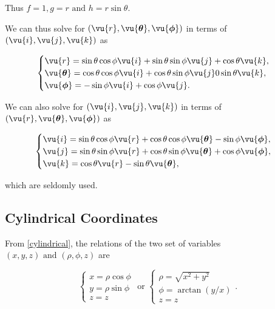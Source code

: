 \documentclass[english,a4paper,12pt]{report}
\begin{document}
Thus \(f = 1, g = r \text { and }  h = r\sin \theta \).

We can thus solve for \((\vu{r} , \vu{\boldsymbol{\theta } }, \vu{\boldsymbol{\phi } })\) in terms of \((\vu{i}, \vu{j} ,\vu{k} )\) as 

\begin{equation}
    \begin{cases}
        \vu{r} = \sin \theta \cos \phi  \vu{i}  + \sin \theta \sin \phi  \vu{j}  + \cos \theta  \vu{k},  \\
        \vu{\boldsymbol{\theta } } = \cos \theta \cos \phi \vu{i}  + \cos \theta \sin \phi \vu{j} 0 \sin \theta \vu{k}, \\
        \vu{\boldsymbol{\phi } } = -\sin \phi  \vu{i} + \cos \phi \vu{j}. 
    \end{cases}
\end{equation}



We can also solve for \((\vu{i} , \vu{j}, \vu{k} )\) in terms of \((\vu{r} , \vu{\boldsymbol{\theta } }, \vu{\boldsymbol{\phi } } )\) as  

\begin{equation}
    \begin{cases}
        \vu{i} = \sin \theta \cos \phi \vu{r} + \cos \theta \cos \phi \vu{\boldsymbol{\theta } } - \sin \phi \vu{\boldsymbol{\phi } }, \\
        \vu{j} = \sin \theta \sin \phi \vu{r} + \cos \theta \sin \phi \vu{\boldsymbol{\theta } } + \cos \phi \vu{\boldsymbol{\phi } }, \\
        \vu{k} = \cos \theta \vu{r} - \sin \theta \vu{\boldsymbol{\theta } },
    \end{cases}
\end{equation}

which are seldomly used.



	
\subsection{Cylindrical Coordinates}

From \cref{cylindrical}, the relations of the two set of variables \((x,y,z) \text { and } (\rho , \phi , z)\)  are

\begin{equation}
    \begin{cases} x = \rho \cos \phi \\ y = \rho \sin \phi \\ z = z \end{cases} \text { or } \begin{cases} \rho  = \sqrt{x^2+y^2} \\  \phi = \arctan {\left( y /x  \right)} \\ z = z \end{cases}. 
\end{equation}
\end{document}
